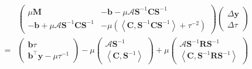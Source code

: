 \begin{eqnarray}
  &  & \left(\begin{array}{cc}
    \mu \mathbf{M} & - \mathbf{b} - \mu \mathcal{A} \mathbf{S}^{- 1} \mathbf{C} \mathbf{S}^{- 1}\\
    - \mathbf{b} + \mu \mathcal{A} \mathbf{S}^{- 1} \mathbf{C} \mathbf{S}^{- 1} & - \mu \left(
    \left\langle \mathbf{C}, \mathbf{S}^{- 1} \mathbf{C} \mathbf{S}^{- 1} \right\rangle + \tau^{- 2} \right)
  \end{array}\right) \left(\begin{array}{c}
    \Delta \mathbf{y}\\
    \Delta \tau
  \end{array}\right)\\ \nonumber
  & = & \left(\begin{array}{c}
    \mathbf{b} \tau\\
    \mathbf{b}^{\top} \mathbf{y} - \mu \tau^{- 1}
  \end{array}\right) - \mu \left(\begin{array}{c}
    \mathcal{A} \mathbf{S}^{- 1}\\
    \left\langle \mathbf{C}, \mathbf{S}^{- 1} \right\rangle
  \end{array}\right) + \mu \left(\begin{array}{c}
    \mathcal{A} \mathbf{S}^{- 1} \mathbf{R} \mathbf{S}^{- 1}\\
    \left\langle \mathbf{C}, \mathbf{S}^{- 1} \mathbf{R} \mathbf{S}^{- 1} \right\rangle
  \end{array}\right) \\ \nonumber
\end{eqnarray}

